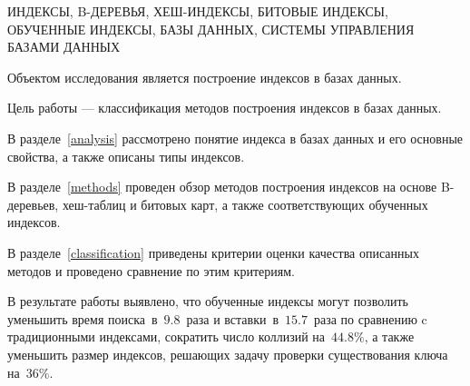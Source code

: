 \begin{essay}{}
    \noindent\mbox{ИНДЕКСЫ,} \mbox{B-ДЕРЕВЬЯ,} \mbox{ХЕШ-ИНДЕКСЫ,}
    \mbox{БИТОВЫЕ} \mbox{ИНДЕКСЫ,} \mbox{ОБУЧЕННЫЕ} \mbox{ИНДЕКСЫ,} \mbox{БАЗЫ}
    \mbox{ДАННЫХ,} \mbox{СИСТЕМЫ} \mbox{УПРАВЛЕНИЯ} \mbox{БАЗАМИ} \mbox{ДАННЫХ}

    Объектом исследования является построение индексов в базах данных.

    Цель работы --- классификация методов построения индексов в базах данных.

    В разделе~\ref{analysis} рассмотрено понятие индекса в базах данных и его
    основные свойства, а также описаны типы индексов.

    В разделе~\ref{methods} проведен обзор методов построения индексов на основе
    B-деревьев, хеш-таблиц и битовых карт, а также соответствующих обученных
    индексов.

    В разделе~\ref{classification} приведены критерии оценки качества описанных
    методов и проведено сравнение по этим критериям.

    В результате работы выявлено, что обученные индексы могут позволить
    уменьшить время поиска~в~$9.8$~раза и вставки~в~$15.7$~раза по сравнению c
    традиционными индексами, сократить число коллизий на~$44.8\%$, а также
    уменьшить размер индексов, решающих задачу проверки существования ключа
    на~$36\%$.

\end{essay}

